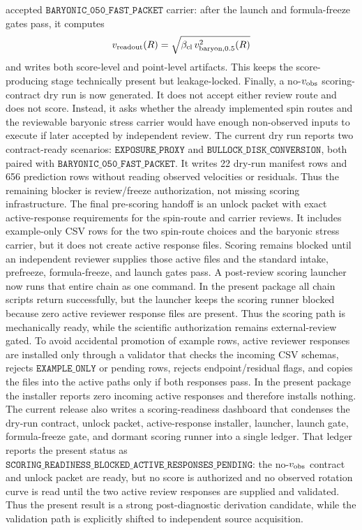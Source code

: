 \documentclass[11pt]{article}
\begin{document}
accepted \(\texttt{BARYONIC\_050\_FAST\_PACKET}\) carrier: after the launch and
formula-freeze gates pass, it computes
\[
v_{\rm readout}(R)=\sqrt{\beta_{\rm cl}\,v_{\rm baryon,0.5}^{2}(R)}
\]
and writes both score-level and point-level artifacts.  This keeps the
score-producing stage technically present but leakage-locked.
Finally, a no-\(v_{\rm obs}\) scoring-contract dry run is now generated.  It
does not accept either review route and does not score.  Instead, it asks
whether the already implemented spin routes and the reviewable baryonic stress
carrier would have enough non-observed inputs to execute if later accepted by
independent review.  The current dry run reports two contract-ready scenarios:
\(\texttt{EXPOSURE\_PROXY}\) and
\(\texttt{BULLOCK\_DISK\_CONVERSION}\), both paired with
\(\texttt{BARYONIC\_050\_FAST\_PACKET}\).  It writes 22 dry-run manifest rows
and 656 prediction rows without reading observed velocities or residuals.
Thus the remaining blocker is review/freeze authorization, not missing scoring
infrastructure.
The final pre-scoring handoff is an unlock packet with exact active-response
requirements for the spin-route and carrier reviews.  It includes example-only
CSV rows for the two spin-route choices and the baryonic stress carrier, but it
does not create active response files.  Scoring remains blocked until an
independent reviewer supplies those active files and the standard intake,
prefreeze, formula-freeze, and launch gates pass.
A post-review scoring launcher now runs that entire chain as one command.  In
the present package all chain scripts return successfully, but the launcher
keeps the scoring runner blocked because zero active reviewer response files
are present.  Thus the scoring path is mechanically ready, while the scientific
authorization remains external-review gated.
To avoid accidental promotion of example rows, active reviewer responses are
installed only through a validator that checks the incoming CSV schemas,
rejects \(\texttt{EXAMPLE\_ONLY}\) or pending rows, rejects endpoint/residual
flags, and copies the files into the active paths only if both responses pass.
In the present package the installer reports zero incoming active responses and
therefore installs nothing.
The current release also writes a scoring-readiness dashboard that condenses
the dry-run contract, unlock packet, active-response installer, launcher,
launch gate, formula-freeze gate, and dormant scoring runner into a single
ledger.  That ledger reports the present status as
\(\texttt{SCORING\_READINESS\_BLOCKED\_ACTIVE\_RESPONSES\_PENDING}\):
the no-\(v_{\rm obs}\) contract and unlock packet are ready, but no score is
authorized and no observed rotation curve is read until the two active review
responses are supplied and validated.
Thus the present result is a strong post-diagnostic derivation candidate, while
the validation path is explicitly shifted to independent source acquisition.
\end{document}
